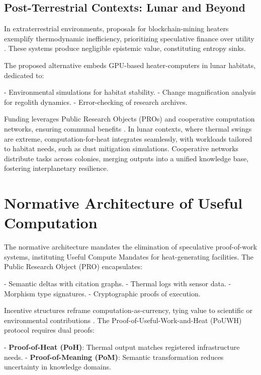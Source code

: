 \documentclass[12pt]{article}
\begin{document}
\subsection{Post-Terrestrial Contexts: Lunar and Beyond}

In extraterrestrial environments, proposals for blockchain-mining heaters exemplify thermodynamic inefficiency, prioritizing speculative finance over utility \citep{ODwyerMalone2014, Mora2018, DeVries2021}. These systems produce negligible epistemic value, constituting entropy sinks.

The proposed alternative embeds GPU-based heater-computers in lunar habitats, dedicated to:

- Environmental simulations for habitat stability.
- Change magnification analysis for regolith dynamics.
- Error-checking of research archives.

Funding leverages Public Research Objects (PROs) and cooperative computation networks, ensuring communal benefits \citep{Carrier1991, Spudis2016, NASAArtemis2023}. In lunar contexts, where thermal swings are extreme, computation-for-heat integrates seamlessly, with workloads tailored to habitat needs, such as dust mitigation simulations. Cooperative networks distribute tasks across colonies, merging outputs into a unified knowledge base, fostering interplanetary resilience.

\section{Normative Architecture of Useful Computation}
\label{sec:normative-architecture}

The normative architecture mandates the elimination of speculative proof-of-work systems, instituting Useful Compute Mandates for heat-generating facilities. The Public Research Object (PRO) encapsulates:

- Semantic deltas with citation graphs.
- Thermal logs with sensor data.
- Morphism type signatures.
- Cryptographic proofs of execution.

Incentive structures reframe computation-as-currency, tying value to scientific or environmental contributions \citep{DalyFarley2011}. The Proof-of-Useful-Work-and-Heat (PoUWH) protocol requires dual proofs:

- \textbf{Proof-of-Heat (PoH)}: Thermal output matches registered infrastructure needs.
- \textbf{Proof-of-Meaning (PoM)}: Semantic transformation reduces uncertainty in knowledge domains.
\end{document}
